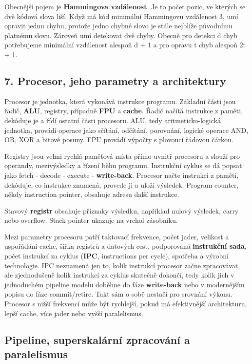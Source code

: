 \documentclass[11pt,a4paper]{article}
\begin{document}
Obecnější pojem je \textbf{Hammingova vzdálenost}. Je to počet pozic, ve kterých se dvě kódová slova liší. Když má kód minimální Hammingovu vzdálenost 3, umí opravit jednu chybu, protože jedno chybné slovo je stále nejblíže původnímu platnému slovu. Zároveň umí detekovat dvě chyby. Obecně pro detekci d chyb potřebujeme minimální vzdálenost alespoň d + 1 a pro opravu t chyb alespoň 2t + 1.

\subsection*{7. Procesor, jeho parametry a architektury}

Procesor je jednotka, která vykonává instrukce programu. Základní části jsou řadič, \textbf{ALU}, registry, případně \textbf{FPU} a \textbf{cache}. Řadič načítá instrukce z paměti, dekóduje je a řídí ostatní části procesoru. ALU, tedy aritmeticko-logická jednotka, provádí operace jako sčítání, odčítání, porovnání, logické operace AND, OR, XOR a bitové posuny. FPU provádí výpočty s plovoucí řádovou čárkou.

Registry jsou velmi rychlá paměťová místa přímo uvnitř procesoru a slouží pro operandy, mezivýsledky a řízení běhu programu. Instrukční cyklus se dá popsat jako fetch - decode - execute - \textbf{write-back}. Procesor načte instrukci z paměti, dekóduje, co instrukce znamená, provede ji a uloží výsledek. Program counter, někdy instruction pointer, obsahuje adresu další instrukce.

Stavový \textbf{registr} obsahuje příznaky výsledku, například nulový výsledek, carry nebo overflow. Stack pointer ukazuje na vrchol zásobníku.

Mezi parametry procesoru patří taktovací frekvence, počet jader, velikost a uspořádání cache, šířka registrů a datových cest, podporovaná \textbf{instrukční sada}, počet instrukcí za cyklus (\textbf{IPC}, instructions per cycle), spotřeba a výrobní technologie. IPC neznamená jen to, kolik instrukcí procesor začne zpracovávat, ale zjednodušeně kolik instrukcí za cyklus skutečně dokončí, tedy kolik jich v jednoduchém pipeline modelu doběhne do fáze \textbf{write-back} nebo v modernějším popisu do fáze commit/retire. Takt sám o sobě nestačí pro srovnání výkonu. Procesor s nižší frekvencí může být rychlejší, pokud má efektivnější architekturu, lepší cache, více jader nebo vyšší paralelismus.

\subsection*{Pipeline, superskalární zpracování a paralelismus}
\end{document}
